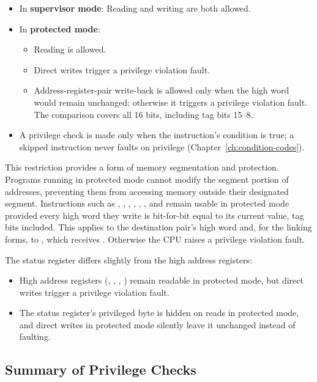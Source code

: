 \begin{itemize}
	\item In \textbf{supervisor mode}: Reading and writing are both allowed.
	\item In \textbf{protected mode}:
	      \begin{itemize}
		      \item Reading is allowed.
		      \item Direct writes trigger a privilege violation fault.
		      \item Address-register-pair write-back is allowed only when the high word would remain unchanged; otherwise it triggers a
		            privilege violation fault. The comparison covers all 16 bits, including tag bits 15--8.
	      \end{itemize}
	\item A privilege check is made only when the instruction's condition is true; a skipped instruction never faults on
	      privilege (Chapter~\ref{ch:condition-codes}).
\end{itemize}

This restriction provides a form of memory segmentation and protection. Programs running in protected mode cannot
modify the segment portion of addresses, preventing them from accessing memory outside their designated segment.
Instructions such as , , , , ,
, and  remain usable in protected mode provided every high word they write is bit-for-bit
equal to its current value, tag bits included. This applies to the destination pair's high word and, for the linking
forms, to , which receives . Otherwise the CPU raises a privilege violation fault.

The status register differs slightly from the high address registers:
\begin{itemize}
	\item High address registers (, , , ) remain readable in protected mode, but direct writes
	      trigger a privilege violation fault.
	\item The status register's privileged byte is hidden on reads in protected mode, and direct writes in protected mode
	      silently leave it unchanged instead of faulting.
\end{itemize}

\subsection{Summary of Privilege Checks}
\label{sec:privilege-check-flow}

